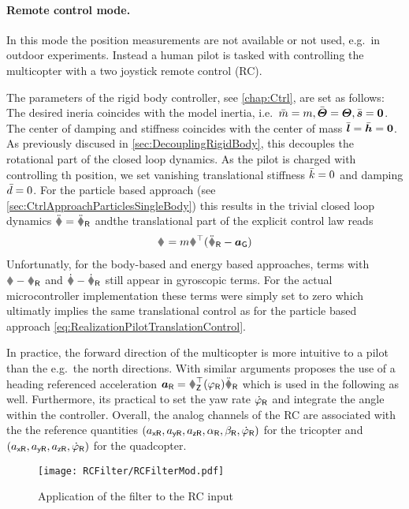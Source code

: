 \paragraph{Remote control mode.}
In this mode the position measurements are not available or not used, e.g.\ in outdoor experiments.
Instead a human pilot is tasked with controlling the multicopter with a two joystick remote control (RC).

The parameters of the rigid body controller, see \autoref{chap:Ctrl}, are set as follows:
The desired ineria coincides with the model inertia, i.e.\ $\bar{m} = m, \bar{\boldsymbol{\varTheta}} = \boldsymbol{\varTheta}, \bar{\boldsymbol{s}}=\boldsymbol{0}$.
The center of damping and stiffness coincides with the center of mass $\bar{\boldsymbol{l}}=\bar{\boldsymbol{h}}=\boldsymbol{0}$.
As previously discused in \autoref{sec:DecouplingRigidBody}, this decouples the rotational part of the closed loop dynamics.
As the pilot is charged with controlling th position, we set vanishing translational stiffness $\bar{k}=0$ and damping $\bar{d}=0$.
For the particle based approach (see \autoref{sec:CtrlApproachParticlesSingleBody}) this results in the trivial closed loop dynamics $\rdd = \rRdd$ andthe translational part of the explicit control law reads
\begin{align}\label{eq:RealizationPilotTranslationControl}
 \bodyForce{}{} = m \R^\top (\rRdd - \gravityAcc)
\end{align}
Unfortunatly, for the body-based and energy based approaches, terms with $\r-\rR$ and $\rd-\rRd$ still appear in gyroscopic terms.
For the actual microcontroller implementation these terms were simply set to zero which ultimatly implies the same translational control as for the particle based approach \eqref{eq:RealizationPilotTranslationControl}.

In practice, the forward direction of the multicopter is more intuitive to a pilot than the e.g.\ the north directions.
With similar arguments \cite{Kastelan:Tricopter} proposes the use of a heading referenced acceleration $\tuple{a}_\idxRef = \R_{\mathsf{Z}}^\top(\yaw_\idxRef) \rRdd$ which is used in the following as well.
Furthermore, its practical to set the yaw rate $\dot{\varphi}_{\mathsf{R}}$ and integrate the angle within the controller.
Overall, the analog channels of the RC are associated with the the reference quantities $(a_{\mathsf{x}\mathsf{R}}, a_{\mathsf{y}\mathsf{R}}, a_{\mathsf{z}\mathsf{R}}, \alpha_{\mathsf{R}}, \beta_{\mathsf{R}}, \dot{\varphi}_{\mathsf{R}})$ for the tricopter and $(a_{\mathsf{x}\mathsf{R}}, a_{\mathsf{y}\mathsf{R}}, a_{\mathsf{z}\mathsf{R}}, \dot{\varphi}_{\mathsf{R}})$ for the quadcopter.

\begin{figure}
\centering
\texttt{[image: RCFilter/RCFilterMod.pdf]} 
\caption{Application of the filter to the RC input}
\label{fig:RCFilter}
\end{figure}

